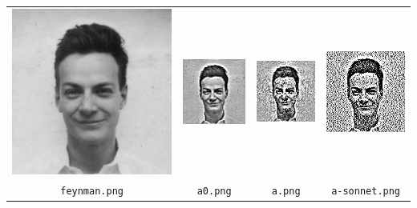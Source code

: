 \begin{tabular}{cccc}
	\includegraphics{i/feynman.png} &
	\includegraphics{a0.png} &
	\includegraphics{a.png} &
	\includegraphics{a-sonnet.png} \\
	\verb+feynman.png+ &
	\verb+a0.png+ &
	\verb+a.png+ &
	\verb+a-sonnet.png+
\end{tabular}

